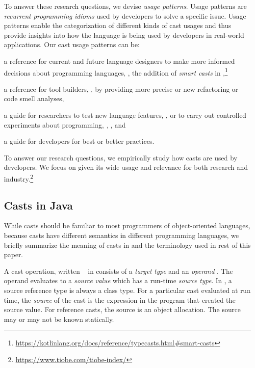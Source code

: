 To answer these research questions, we devise
\emph{usage patterns}.
Usage patterns are \emph{recurrent programming idioms} used by developers to solve a specific issue.
Usage patterns enable the categorization of different kinds of cast usages and
thus provide insights into how the language is being used by developers in real-world applications.
Our cast usage patterns can be:
\begin{inparaenum}[(1)]
\item a reference for current and future language designers
to make more informed decisions about programming languages,
\eg{},
the addition of \emph{smart casts} in ,\footnote{\url{https://kotlinlang.org/docs/reference/typecasts.html\#smart-casts}}
\item a reference for tool builders, \eg{}, by providing more precise or new
  refactoring or code smell analyses,
\item a guide for researchers to test new language features, \eg{}, \cite{wintherGuardedTypePromotion2011} or to carry out controlled
  experiments about programming, \eg{}, \cite{stuchlikStaticVsDynamic2011}, and
\item a guide for developers for best or better practices.
\end{inparaenum}
To answer our research questions,
we empirically study how casts
are used by developers.
We focus on \java{} given its wide usage and relevance for both
research and industry.\footnote{\url{https://www.tiobe.com/tiobe-index/}}

\subsection*{Casts in Java}

While casts should be familiar to most programmers of object-oriented languages, 
because casts have different semantics in different programming languages,
we briefly summarize the meaning of casts in \java{} and the terminology used in rest of this paper.

A cast operation, written ~ in \java{}
consists of a \emph{target type}  and an \emph{operand} .
The operand evaluates to a \emph{source value} which has a run-time
\emph{source type}.
In \java{}, a source reference type is always a class type.
For a particular cast evaluated at run time, 
the \emph{source} of the cast is the expression in the program that
created the source value.
For reference casts, the source is an object allocation.
The source may or may not be known statically.

